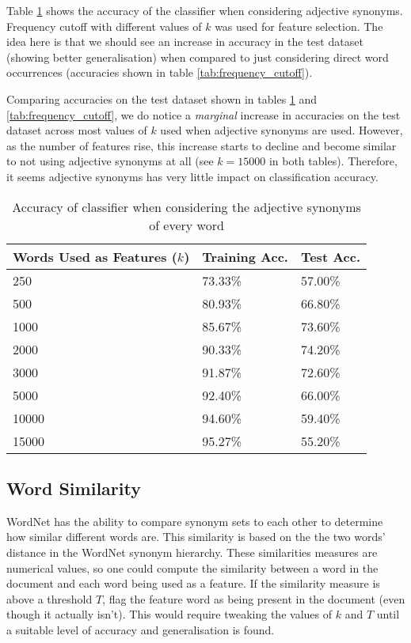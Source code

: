 \documentclass{article}
\begin{document}
Table \ref{tab:adjective_synonyms} shows the accuracy of the classifier when considering adjective synonyms. Frequency cutoff with different values of $k$ was used for feature selection. The idea here is that we should see an increase in accuracy in the test dataset (showing better  generalisation) when compared to just considering direct word occurrences (accuracies shown in table \ref{tab:frequency_cutoff}).

Comparing accuracies on the test dataset shown in tables \ref{tab:adjective_synonyms} and \ref{tab:frequency_cutoff}, we do notice a \textit{marginal} increase in accuracies on the test dataset across most values of $k$ used when adjective synonyms are used. However, as the number of features rise, this increase starts to decline and become similar to not using adjective synonyms at all (see $k = 15000$ in both tables). Therefore, it seems adjective synonyms has very little impact on classification accuracy.

\begin{table}
	\centering
	\begin{tabular}{|l|l|l|}
	\hline
	\textbf{Words Used as Features ($k$)} & \textbf{Training Acc.} & \textbf{Test Acc.} \\
	\hline
	250 & 73.33\% & 57.00\% \\
	500 & 80.93\% & 66.80\% \\
	1000 & 85.67\% & 73.60\% \\
	2000 & 90.33\% & 74.20\% \\
	3000 & 91.87\% & 72.60\% \\
	5000 & 92.40\% & 66.00\% \\
	10000 & 94.60\% & 59.40\% \\
	15000 & 95.27\% & 55.20\% \\
	\hline
	\end{tabular}
	\caption{Accuracy of classifier when considering the adjective synonyms of every word}
	\label{tab:adjective_synonyms}
\end{table}

\subsection{Word Similarity}

WordNet has the ability to compare synonym sets to each other to determine how similar different words are. This similarity is based on the the two words' distance in the WordNet synonym hierarchy. These similarities measures are numerical values, so one could compute the similarity between a word in the document and each word being used as a feature. If the similarity measure is above a threshold $T$, flag the feature word as being present in the document (even though it actually isn't). This would require tweaking the values of $k$ and $T$ until a suitable level of accuracy and generalisation is found. 
\end{document}
